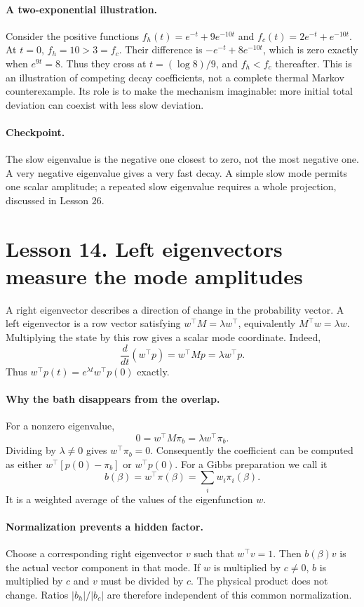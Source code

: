 \documentclass[11pt]{article}
\begin{document}
\paragraph{A two-exponential illustration.}
Consider the positive functions
$f_h(t)=e^{-t}+9e^{-10t}$ and $f_c(t)=2e^{-t}+e^{-10t}$.
At $t=0$, $f_h=10>3=f_c$. Their difference is
$-e^{-t}+8e^{-10t}$, which is zero exactly when $e^{9t}=8$.
Thus they cross at $t=(\log8)/9$, and $f_h<f_c$ thereafter.
This is an illustration of competing decay coefficients, not a complete
thermal Markov counterexample. Its role is to make the mechanism imaginable:
more initial total deviation can coexist with less slow deviation.

\paragraph{Checkpoint.}
The slow eigenvalue is the negative one closest to zero, not the most negative
one. A very negative eigenvalue gives a very fast decay. A simple slow mode
permits one scalar amplitude; a repeated slow eigenvalue requires a whole
projection, discussed in Lesson 26.

\clearpage
\section*{Lesson 14. Left eigenvectors measure the mode amplitudes}
A right eigenvector describes a direction of change in the probability
vector. A left eigenvector is a row vector satisfying
$w^\top M=\lambda w^\top$, equivalently $M^\top w=\lambda w$.
Multiplying the state by this row gives a scalar mode coordinate. Indeed,
\[
\frac{d}{dt}(w^\top p)=w^\top Mp=\lambda w^\top p.
\]
Thus $w^\top p(t)=e^{\lambda t}w^\top p(0)$ exactly.

\paragraph{Why the bath disappears from the overlap.}
For a nonzero eigenvalue,
\[
0=w^\top M\pi_b=\lambda w^\top\pi_b.
\]
Dividing by $\lambda\ne0$ gives $w^\top\pi_b=0$. Consequently the
coefficient can be computed as either $w^\top[p(0)-\pi_b]$ or
$w^\top p(0)$. For a Gibbs preparation we call it
\[
b(\beta)=w^\top\pi(\beta)=\sum_i w_i\pi_i(\beta).
\]
It is a weighted average of the values of the eigenfunction $w$.

\paragraph{Normalization prevents a hidden factor.}
Choose a corresponding right eigenvector $v$ such that $w^\top v=1$.
Then $b(\beta)v$ is the actual vector component in that mode. If $w$ is
multiplied by $c\ne0$, $b$ is multiplied by $c$ and $v$ must be divided by
$c$. The physical product does not change. Ratios $|b_h|/|b_c|$ are therefore
independent of this common normalization.
\end{document}
